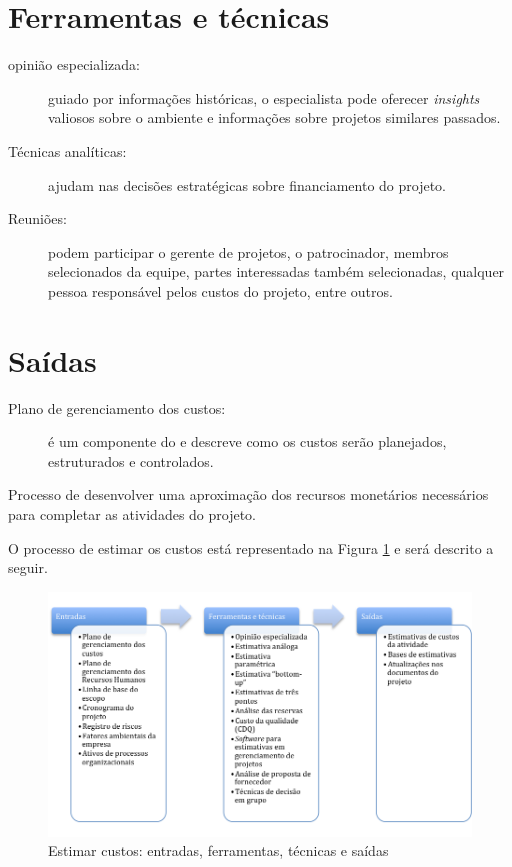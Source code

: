 \section{Ferramentas e técnicas}

\begin{description}

	\item[opinião especializada:] guiado por informações históricas, o especialista pode oferecer \textit{insights} valiosos sobre o ambiente e informações sobre projetos similares passados.

	\item[Técnicas analíticas:] ajudam nas decisões estratégicas sobre financiamento do projeto.
	
	\item[Reuniões:] podem participar o gerente de projetos, o patrocinador, membros selecionados da equipe, partes interessadas também selecionadas, qualquer pessoa responsável pelos custos do projeto, entre outros.
	
\end{description}

\section{Saídas}

\begin{description}
	
	\item[Plano de gerenciamento dos custos:] é um componente do \planproj e descreve como os custos serão planejados, estruturados e controlados.

\end{description}


Processo de desenvolver uma aproximação dos recursos monetários necessários para completar as atividades do projeto. 

O processo de estimar os custos está representado na Figura \ref{fig:custos:estimar:efts} e será descrito a seguir.

\begin{figure}[!h]
	\centering
	\includegraphics[scale=0.5]{Figuras/custos_efts_estimar.png}
	\caption{Estimar custos: entradas, ferramentas, técnicas e saídas}
	\label{fig:custos:estimar:efts}
\end{figure}

